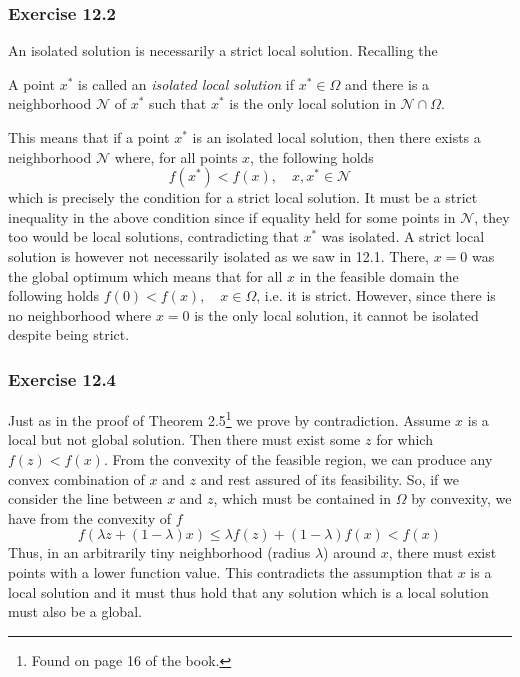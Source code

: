 \subsubsection{Exercise 12.2}
An isolated solution is necessarily a strict local solution.
Recalling the
\begin{Def}
    A point $x^*$ is called an \textit{isolated local solution} if $x^*\in\Omega$ and there is a neighborhood $\mathcal{N}$ of $x^*$ such that $x^*$ is the only local solution in $\mathcal{N}\cap\Omega$.
\end{Def}
This means that if a point $x^*$ is an isolated local solution, then there exists a neighborhood $\mathcal{N}$ where, for all points $x$, the following holds
\[
    f(x^*) < f(x), \quad x, x^* \in \mathcal{N}
\]
which is precisely the condition for a strict local solution.
It must be a strict inequality in the above condition since if equality held for some points in $\mathcal{N}$, they too would be local solutions, contradicting that $x^*$ was isolated.
A strict local solution is however not necessarily isolated as we saw in 12.1. There, $x = 0$ was the global optimum which means that for all $x$ in the feasible domain the following holds $f(0) < f(x), \quad x\in\Omega$, i.e. it is strict.
However, since there is no neighborhood where $x = 0$ is the only local solution, it cannot be isolated despite being strict.
\subsubsection{Exercise 12.4}
Just as in the proof of Theorem 2.5\footnote{Found on page 16 of the book.} we prove by contradiction.
Assume $x$ is a local but not global solution. Then there must exist some $z$ for which $f(z) < f(x)$.
From the convexity of the feasible region, we can produce any convex combination of $x$ and $z$ and rest assured of its feasibility.
So, if we consider the line between $x$ and $z$, which must be contained in $\Omega$ by convexity, we have from the convexity of $f$
\[
    f(\lambda z + (1 - \lambda)x) \leq \lambda f(z) + (1 - \lambda) f(x) < f(x)
\]
Thus, in an arbitrarily tiny neighborhood (radius $\lambda$) around $x$, there must exist points with a lower function value.
This contradicts the assumption that $x$ is a local solution and it must thus hold that any solution which is a local solution must also be a global.\hfill\sq

